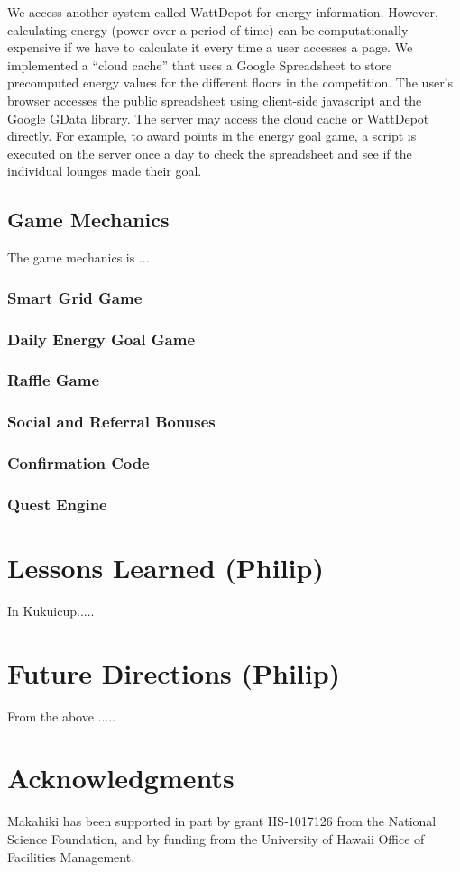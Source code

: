 \documentclass{acm_proc_article-sp}
\begin{document}
We access another system called WattDepot for energy information. However, calculating energy (power over a period of time) can be computationally expensive if we have to calculate it every time a user accesses a page. We implemented a ``cloud cache'' that uses a Google Spreadsheet to store precomputed energy values for the different floors in the competition. The user's browser accesses the public spreadsheet using client-side javascript and the Google GData library. The server may access the cloud cache or WattDepot directly. For example, to award points in the energy goal game, a script is executed on the server once a day to check the spreadsheet and see if the individual lounges made their goal.

\subsection{Game Mechanics}
The game mechanics is ...

\subsubsection{Smart Grid Game}
\subsubsection{Daily Energy Goal Game}
\subsubsection{Raffle Game}
\subsubsection{Social and Referral Bonuses}
\subsubsection{Confirmation Code}
\subsubsection{Quest Engine}

\section{Lessons Learned (Philip)}
In Kukuicup.....

\section{Future Directions (Philip)}
From the above .....

\section{Acknowledgments}
Makahiki has been supported in part by grant IIS-1017126 from the National
Science Foundation, and by funding from the University of Hawaii Office of Facilities
Management. 


  

\balancecolumns
\end{document}

